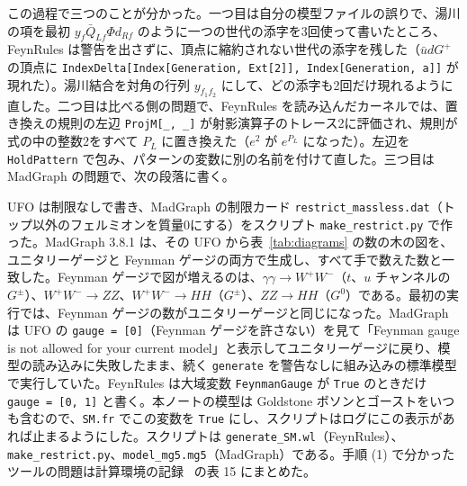 \documentclass[a4paper,10pt]{ltjsarticle}
\begin{document}
この過程で三つのことが分かった。一つ目は自分の模型ファイルの誤りで、湯川の項を最初 $y_f\bar Q_{Lf}\Phi d_{Rf}$ のように一つの世代の添字を3回使って書いたところ、FeynRules は警告を出さずに、頂点に縮約されない世代の添字を残した（$\bar udG^+$ の頂点に \texttt{IndexDelta[Index[Generation, Ext[2]], Index[Generation, a]]} が現れた）。湯川結合を対角の行列 $y_{f_1f_2}$ にして、どの添字も2回だけ現れるように直した。二つ目は比べる側の問題で、FeynRules を読み込んだカーネルでは、置き換えの規則の左辺 \texttt{ProjM[\_, \_]} が射影演算子のトレース2に評価され、規則が式の中の整数2をすべて $P_L$ に置き換えた（$e^2$ が $e^{P_L}$ になった）。左辺を \texttt{HoldPattern} で包み、パターンの変数に別の名前を付けて直した。三つ目は MadGraph の問題で、次の段落に書く。

UFO は制限なしで書き、MadGraph の制限カード \texttt{restrict\_massless.dat}（トップ以外のフェルミオンを質量0にする）をスクリプト \texttt{make\_restrict.py} で作った。MadGraph 3.8.1 は、その UFO から表~\ref{tab:diagrams} の数の木の図を、ユニタリーゲージと Feynman ゲージの両方で生成し、すべて手で数えた数と一致した。Feynman ゲージで図が増えるのは、$\gamma\gamma\to W^+W^-$（$t$、$u$ チャンネルの $G^\pm$）、$W^+W^-\to ZZ$、$W^+W^-\to HH$（$G^\pm$）、$ZZ\to HH$（$G^0$）である。最初の実行では、Feynman ゲージの数がユニタリーゲージと同じになった。MadGraph は UFO の \texttt{gauge = [0]}（Feynman ゲージを許さない）を見て「Feynman gauge is not allowed for your current model」と表示してユニタリーゲージに戻り、模型の読み込みに失敗したまま、続く \texttt{generate} を警告なしに組み込みの標準模型で実行していた。FeynRules は大域変数 \texttt{FeynmanGauge} が \texttt{True} のときだけ \texttt{gauge = [0, 1]} と書く。本ノートの模型は Goldstone ボソンとゴーストをいつも含むので、\texttt{SM.fr} でこの変数を \texttt{True} にし、スクリプトはログにこの表示があれば止まるようにした。スクリプトは \texttt{generate\_SM.wl}（FeynRules）、\texttt{make\_restrict.py}、\texttt{model\_mg5.mg5}（MadGraph）である。手順 (1) で分かったツールの問題は計算環境の記録~\cite{env} の表 15 にまとめた。
\end{document}
